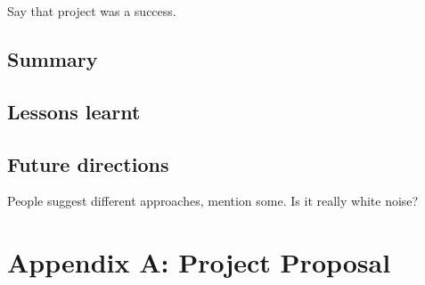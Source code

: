 \documentclass[12pt,british,twoside,notitlepage,usenames,dvipsnames,hypens,final]{report}
\numberwithin{equation}{section}
\numberwithin{figure}{section}
\begin{document}
Say that project was a success.

\section{Summary}

\section{Lessons learnt}

\section{Future directions}

People suggest different approaches, mention some. Is it really white noise?

\cleardoublepage



\appendix
\cleardoublepage
{}
\chapter*{Appendix A: Project Proposal}


\end{document}
